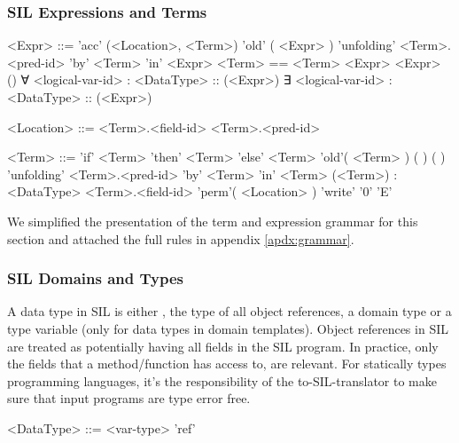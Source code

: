 \subsubsection{SIL Expressions and Terms}
\begin{grammar}
<Expr> ::= 'acc' (<Location>, <Term>)
	\alt 'old' ( <Expr> )
	\alt 'unfolding' <Term>.<pred-id> 'by' <Term> 'in' <Expr>
	\alt <Term> == <Term>
	\alt <unary-op> <Expr>
	\alt <binary-op> <Expr>
	\alt <dom-pred-id>()
	\alt ∀ <logical-var-id> : <DataType> :: (<Expr>)
	\alt ∃ <logical-var-id> : <DataType> :: (<Expr>)

<Location> ::= <Term>.<field-id>
	\alt <Term>.<pred-id>
\end{grammar}

\begin{grammar}
<Term> ::= 'if' <Term> 'then' <Term> 'else' <Term>
	\alt <var-id>
	\alt <logical-var-id>
	\alt 'old'( <Term> )
	\alt <func-id>(  )
	\alt <dom-func-id>(  )
	\alt 'unfolding' <Term>.<pred-id> 'by' <Term> 'in' <Term>
	\alt (<Term>) : <DataType>
	\alt <Term>.<field-id>
	\alt 'perm'( <Location> )
	\alt 'write'
	\alt '0'
	\alt  'E'
	\alt <integer-literal>
\end{grammar}

We simplified the presentation of the term and expression grammar for this section and attached the full rules in appendix \ref{apdx:grammar}.

\subsubsection{SIL Domains and Types}
A data type in SIL is either , the type of all object references, a domain type or a type variable (only for data types in domain templates).
Object references in SIL are treated as potentially having all fields in the SIL program. In practice, only the fields that a method/function has access to, are relevant.
For statically types programming languages, it's the responsibility of the to-SIL-translator to make sure that input programs are type error free.
\begin{grammar}
<DataType> 
	::=  <var-type>
	\alt <dom-type>
	\alt 'ref'
\end{grammar}

